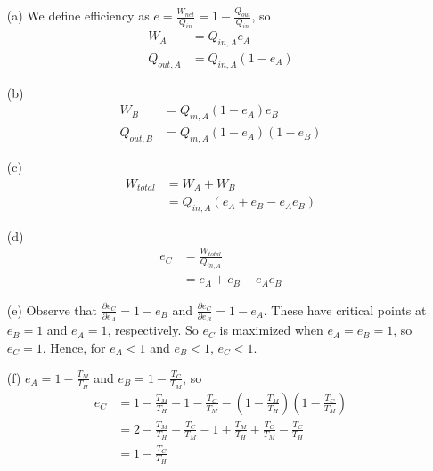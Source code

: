 \documentclass{article}
\begin{document}
\begin{itemize}
	\item[(a)] We define efficiency as $e=\frac{W_{net}}{Q_{in}} = 1-\frac{Q_{out}}{Q_{in}}$, so
	\begin{align*}
	W_A &= Q_{in,A}e_A \\
	Q_{out,A} &= Q_{in,A}(1-e_A)
	\end{align*}
	\item[(b)]
	\begin{align*}
	W_B &= Q_{in,A}(1-e_A)e_B \\
	Q_{out,B} &= Q_{in,A}(1-e_A)(1-e_B)
	\end{align*}
	\item[(c)]
	\begin{align*}
	W_{total} &= W_{A} + W_{B} \\
	&= Q_{in,A}(e_A + e_B - e_Ae_B)
	\end{align*}
	\item[(d)]
	\begin{align*}
	e_C &= \frac{W_{total}}{Q_{in,A}} \\
	&= e_A+e_B-e_Ae_B
	\end{align*}
	\item[(e)] Observe that $\frac{\partial e_C}{\partial e_A} = 1-e_B$ and $\frac{\partial e_C}{\partial e_B} = 1-e_A$. These have critical points at $e_B = 1$ and $e_A = 1$, respectively. So $e_C$ is maximized when $e_A = e_B = 1$, so $e_C = 1$. Hence, for $e_A<1$ and $e_B<1$, $e_C<1$.
	\item[(f)] $e_A = 1-\frac{T_M}{T_H}$ and $e_B = 1-\frac{T_C}{T_M}$, so
	\begin{align*}
	e_C &= 1-\frac{T_M}{T_H} + 1 - \frac{T_C}{T_M} - \left(1-\frac{T_M}{T_H}\right)\left(1-\frac{T_C}{T_M}\right) \\
	&= 2-\frac{T_M}{T_H}-\frac{T_C}{T_M} - 1 + \frac{T_M}{T_H} + \frac{T_C}{T_M} - \frac{T_C}{T_H} \\
	&= 1 - \frac{T_C}{T_H}
	\end{align*}
\end{itemize}
\end{document}
